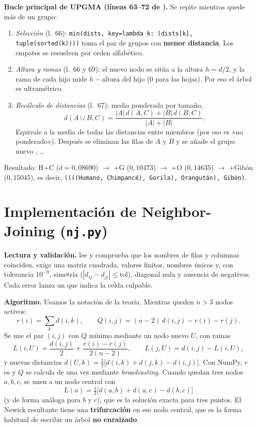 \documentclass[10pt,a4paper]{article}
\begin{document}
\textbf{Bucle principal de UPGMA (líneas 63--72 de ).} Se repite mientras quede más de un grupo:
\begin{enumerate}
\item \emph{Selección} (l.~66): \texttt{min(dists, key=lambda k: (dists[k], tuple(sorted(k))))} toma el par de grupos con \textbf{menor distancia}. Los empates se resuelven por orden alfabético.
\item \emph{Altura y ramas} (l.~66 y 69): el nuevo nodo se sitúa a la altura $h = d/2$, y la rama de cada hijo mide $h - \text{altura del hijo}$ (0 para las hojas). Por eso el árbol es ultramétrico.
\item \emph{Recálculo de distancias} (l.~67): media ponderada por tamaño,
\[ d(A\cup B, C) = \frac{|A|\,d(A,C) + |B|\,d(B,C)}{|A|+|B|}. \]
Equivale a la media de todas las distancias entre miembros (por eso es «no ponderado»). Después se eliminan las filas de $A$ y $B$ y se añade el grupo nuevo , \dots
\end{enumerate}
Resultado: H+C ($d=0{,}08690$) $\to$ +G ($0{,}10473$) $\to$ +O ($0{,}14635$) $\to$ +Gibón ($0{,}15045$), es decir, \texttt{((((Humano, Chimpancé), Gorila), Orangután), Gibón)}.

\section{Implementación de Neighbor-Joining (\texttt{nj.py})}

\textbf{Lectura y validación.}  lee  y comprueba que los nombres de filas y columnas coinciden.  exige una matriz cuadrada, valores finitos, nombres únicos y, con tolerancia $10^{-9}$, simetría ($|d_{ij}-d_{ji}|\le \text{tol}$), diagonal nula y ausencia de negativos. Cada error lanza un  que indica la celda culpable.

\textbf{Algoritmo.} Usamos la notación de la teoría. Mientras queden $n>3$ nodos activos:
\[
r(i)=\sum_k d(i,k), \qquad Q(i,j)=(n-2)\,d(i,j)-r(i)-r(j).
\]
Se une el par $(i,j)$ con $Q$ mínimo mediante un nodo nuevo $U$, con ramas
\[
L(i,U)=\frac{d(i,j)}{2}+\frac{r(i)-r(j)}{2(n-2)}, \qquad L(j,U)=d(i,j)-L(i,U),
\]
y nuevas distancias $d(U,k)=\tfrac{1}{2}\bigl[d(i,k)+d(j,k)-d(i,j)\bigr]$. Con NumPy, $r$ es  y $Q$ se calcula de una vez mediante \emph{broadcasting}. Cuando quedan tres nodos $a,b,c$, se unen a un nodo central con
\[
L(a)=\tfrac{1}{2}\bigl[d(a,b)+d(a,c)-d(b,c)\bigr]
\]
(y de forma análoga para $b$ y $c$), que es la solución exacta para tres puntos. El Newick resultante tiene una \textbf{trifurcación} en ese nodo central, que es la forma habitual de escribir un árbol \textbf{no enraizado}.
\end{document}
